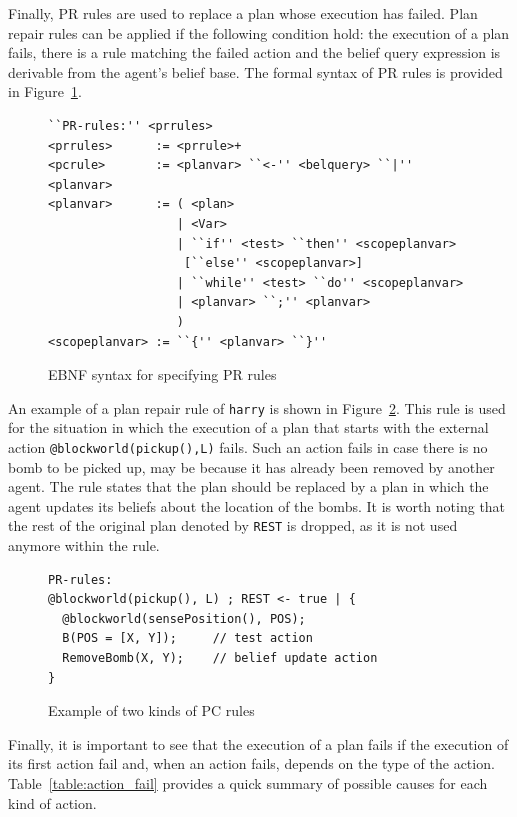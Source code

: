 \documentclass[a4paper]{article}
\begin{document}
Finally, PR rules are used to replace a plan whose execution has failed. Plan repair rules can be applied if the following condition hold: the execution of a plan fails, there is a rule matching the failed action and the belief query expression is derivable from the agent's belief base. The formal syntax of PR rules is provided in Figure~\ref{fig:ebnf_prrules}.

\begin{figure}[htp]
\begin{verbatim}
``PR-rules:'' <prrules>
<prrules>      := <prrule>+
<pcrule>       := <planvar> ``<-'' <belquery> ``|'' <planvar>
<planvar>      := ( <plan>
                  | <Var>
                  | ``if'' <test> ``then'' <scopeplanvar>
                   [``else'' <scopeplanvar>]
                  | ``while'' <test> ``do'' <scopeplanvar> 
                  | <planvar> ``;'' <planvar>
                  )
<scopeplanvar> := ``{'' <planvar> ``}''
\end{verbatim}
\caption{EBNF syntax for specifying PR rules}
\label{fig:ebnf_prrules}
\end{figure}

An example of a plan repair rule of \texttt{harry} is shown in Figure~\ref{fig:example_pcrules}. This rule is used for the situation in which the execution of a plan that starts with the external action \texttt{@blockworld(pickup(),L)} fails. Such an action fails in case there is no bomb to be picked up, may be because it has already been removed by another agent. The rule states that the plan should be replaced by a plan in which the agent updates its beliefs about the location of the bombs. It is worth noting that the rest of the original plan denoted by \texttt{REST} is dropped, as it is not used anymore within the rule.

\begin{figure}[htp]
\begin{verbatim}
PR-rules:
@blockworld(pickup(), L) ; REST <- true | { 
  @blockworld(sensePosition(), POS);
  B(POS = [X, Y]);     // test action	
  RemoveBomb(X, Y);    // belief update action
}
\end{verbatim}
\caption{Example of two kinds of PC rules}
\label{fig:example_pcrules}
\end{figure}

Finally, it is important to see that the execution of a plan fails if the execution of its first action fail and, when an action fails, depends on the type of the action. Table~\ref{table:action_fail} provides a quick summary of possible causes for each kind of action.
\end{document}
